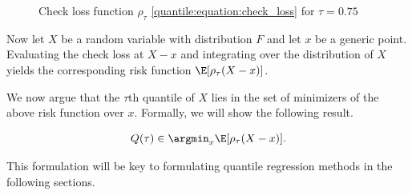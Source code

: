 \begin{figure}[ht!]
	\centering
	\caption{Check loss function $\rho_{\tau}$ \eqref{quantile:equation:check_loss} for $\tau=0.75$} \label{quantile:figure:check_loss}
\end{figure}

Now let $X$ be a random variable with distribution $F$ and let $x$ be a generic point.
%
Evaluating the check loss at $X-x$ and integrating over the distribution of $X$ yields the corresponding risk function $\E[\rho_{\tau}(X-x)]$. 

 We  now argue that the $\tau$th quantile of $X$ lies in the set of minimizers of the above risk function over $x$. Formally, we will show the following result.
 
 \begin{cl}
  
 
 \begin{equation}\label{quantile:equation:quantile_minimizer_check_risk}
 Q(\tau) \in \argmin_x  \E[\rho_{\tau}(X-x)].
 \end{equation}\end{cl}
 This formulation will be key to formulating quantile regression methods in the following sections.
 
